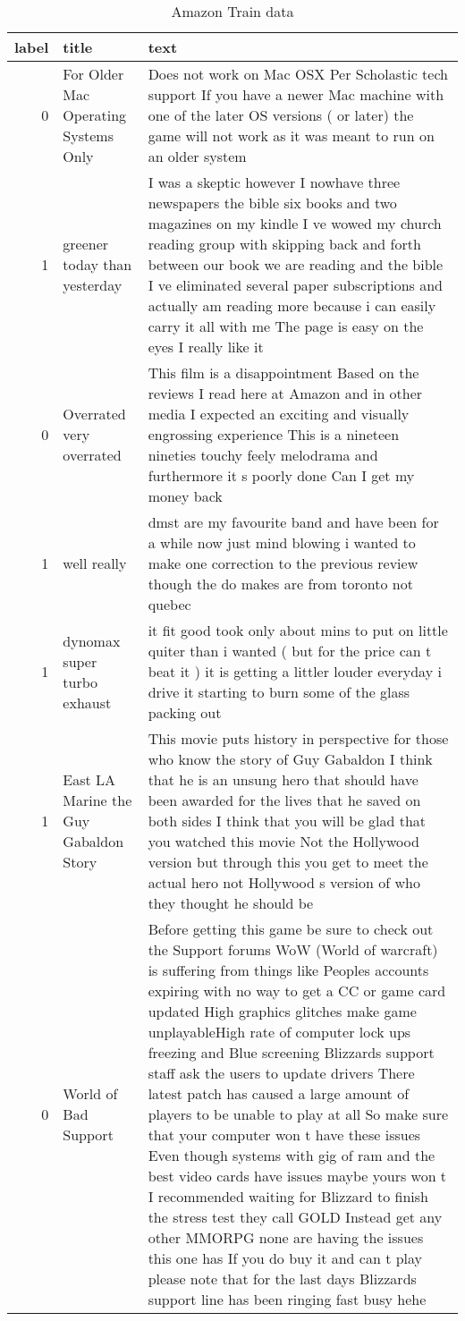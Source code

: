 \documentclass[
]{article}
\begin{document}
\begin{table}[H]

\caption{\label{tab:chk_data_2}Amazon Train  data\label{tbl:amazon_train}}
\centering
\fontsize{6}{8}\selectfont
\begin{tabular}[t]{rll}
\toprule
label & title & text\\
\midrule
0 & For Older Mac Operating Systems Only & Does not work on Mac OSX Per Scholastic tech support If you have a newer Mac machine with one of the later OS versions ( or later) the game will not work as it was meant to run on an older system\\
1 & greener today than yesterday & I was a skeptic however I nowhave three newspapers the bible six books and two magazines on my kindle I ve wowed my church reading group with skipping back and forth between our book we are reading and the bible I ve eliminated several paper subscriptions and actually am reading more because i can easily carry it all with me The page is easy on the eyes I really like it\\
0 & Overrated very overrated & This film is a disappointment Based on the reviews I read here at Amazon and in other media I expected an exciting and visually engrossing experience This is a nineteen nineties touchy feely melodrama and furthermore it s poorly done Can I get my money back\\
1 & well really & dmst are my favourite band and have been for a while now just mind blowing i wanted to make one correction to the previous review though the do makes are from toronto not quebec\\
1 & dynomax super turbo exhaust & it fit good took only about mins to put on little quiter than i wanted ( but for the price can t beat it ) it is getting a littler louder everyday i drive it starting to burn some of the glass packing out\\
1 & East LA Marine the Guy Gabaldon Story & This movie puts history in perspective for those who know the story of Guy Gabaldon I think that he is an unsung hero that should have been awarded for the lives that he saved on both sides I think that you will be glad that you watched this movie Not the Hollywood version but through this you get to meet the actual hero not Hollywood s version of who they thought he should be\\
0 & World of Bad Support & Before getting this game be sure to check out the Support forums WoW (World of warcraft) is suffering from things like Peoples accounts expiring with no way to get a CC or game card updated High graphics glitches make game unplayableHigh rate of computer lock ups freezing and Blue screening Blizzards support staff ask the users to update drivers There latest patch has caused a large amount of players to be unable to play at all So make sure that your computer won t have these issues Even though systems with gig of ram and the best video cards have issues maybe yours won t I recommended waiting for Blizzard to finish the stress test they call GOLD Instead get any other MMORPG none are having the issues this one has If you do buy it and can t play please note that for the last days Blizzards support line has been ringing fast busy hehe\\

\end{tabular}
\end{table}
\end{document}
